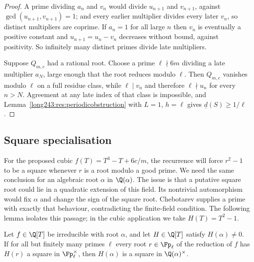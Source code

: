 \begin{proof}
A prime dividing $a_n$ and $v_n$ would divide $u_{n+1}$ and $v_{n+1}$, against
$\gcd(u_{n+1},v_{n+1})=1$; and every earlier multiplier divides every later
$v_n$, so distinct multipliers are coprime.  If $a_n=1$ for all large $n$ then
$v_n$ is eventually a positive constant and $u_{n+1}=u_n-v_n$ decreases without
bound, against positivity.  So infinitely many distinct primes divide late
multipliers.

Suppose $Q_{m,c}$ had a rational root.  Choose a prime $\ell\nmid6m$ dividing a
late multiplier $a_N$, large enough that the root reduces modulo $\ell$.  Then
$Q_{m,c}$ vanishes modulo $\ell$ on a full residue class, while $\ell\mid v_n$
and therefore $\ell\nmid u_n$ for every $n>N$.  Agreement at any late index of
that class is impossible, and
Lemma~\ref{long243:res:periodicobstruction} with $L=1$, $h=\ell$ gives
$\underline d(S)\ge1/\ell$.
\end{proof}

\subsection{Square specialisation}

For the proposed cubic $f(T)=T^3-T+6c/m$, the recurrence will force
$r^2-1$ to be a square whenever $r$ is a root modulo a good prime.
We need the same conclusion for an algebraic root $\alpha$ in
$\Q(\alpha)$. The issue is that a putative square root could lie in a
quadratic extension of this field. Its nontrivial automorphism would
fix $\alpha$ and change the sign of the square root. Chebotarev supplies
a prime with exactly that behaviour, contradicting the finite-field
condition. The following lemma isolates this passage; in the cubic
application we take $H(T)=T^2-1$.

\begin{lemma}\label{long243:res:squarespec}
Let $f\in\Q[T]$ be irreducible with root $\alpha$, and let $H\in\Q[T]$ satisfy
$H(\alpha)\ne0$.  If for all but finitely many primes $\ell$ every root
$r\in\Fp_\ell$ of the reduction of $f$ has $H(r)$ a square in $\Fp_\ell^\times$,
then $H(\alpha)$ is a square in $\Q(\alpha)^\times$.
\end{lemma}

